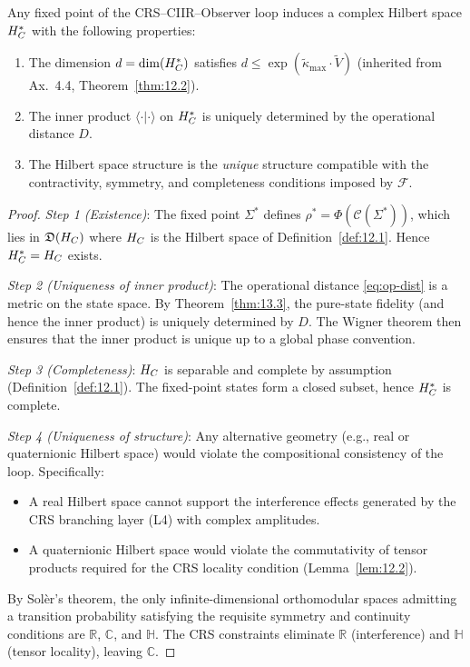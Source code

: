 \begin{theorem}\label{thm:13.4}
Any fixed point of the CRS--CIIR--Observer loop induces a complex
Hilbert space $H_C^*$ with the following properties:
\begin{enumerate}
  \item The dimension $d = \dim(H_C^*)$ satisfies
    $d \leq \exp(\tilde{\kappa}_{\max} \cdot \tilde{V})$
    (inherited from Ax.~4.4, Theorem~\ref{thm:12.2}).
  \item The inner product $\langle \cdot | \cdot \rangle$ on $H_C^*$
    is uniquely determined by the operational distance $D$.
  \item The Hilbert space structure is the \emph{unique} structure
    compatible with the contractivity, symmetry, and completeness
    conditions imposed by $\mathcal{F}$.
\end{enumerate}
\end{theorem}

\begin{proof}
\emph{Step 1 (Existence)}: The fixed point $\Sigma^*$ defines
$\rho^* = \Phi(\mathcal{C}(\Sigma^*))$, which lies in
$\mathfrak{D}(H_C)$ where $H_C$ is the Hilbert space of
Definition~\ref{def:12.1}.  Hence $H_C^* = H_C$ exists.

\emph{Step 2 (Uniqueness of inner product)}: The operational
distance \eqref{eq:op-dist} is a metric on the state space.
By Theorem~\ref{thm:13.3}, the pure-state fidelity (and hence
the inner product) is uniquely determined by $D$.  The Wigner
theorem then ensures that the inner product is unique up to a
global phase convention.

\emph{Step 3 (Completeness)}: $H_C$ is separable and complete
by assumption (Definition~\ref{def:12.1}).  The fixed-point
states form a closed subset, hence $H_C^*$ is complete.

\emph{Step 4 (Uniqueness of structure)}: Any alternative geometry
(e.g., real or quaternionic Hilbert space) would violate the
compositional consistency of the loop.  Specifically:
\begin{itemize}
  \item A real Hilbert space cannot support the interference effects
    generated by the CRS branching layer (L4) with complex amplitudes.
  \item A quaternionic Hilbert space would violate the commutativity
    of tensor products required for the CRS locality condition
    (Lemma~\ref{lem:12.2}).
\end{itemize}
By Sol\`er's theorem, the only infinite-dimensional
orthomodular spaces admitting a transition probability
satisfying the requisite symmetry and continuity conditions
are $\mathbb{R}$, $\mathbb{C}$, and $\mathbb{H}$.  The
CRS constraints eliminate $\mathbb{R}$ (interference)
and $\mathbb{H}$ (tensor locality), leaving $\mathbb{C}$.
\end{proof}

